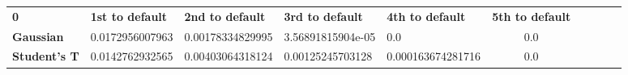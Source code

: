 \begin{tabular}{|l|l|l|l|l|c|c|c|c|c|}
\hline
\textbf{0} & \textbf{1st to default} & \textbf{2nd to default} & \textbf{3rd to default} & \textbf{4th to default} & \textbf{5th to default}\\\hhline{|=|=|=|=|=|=|}
\textbf{Gaussian} & 0.0172956007963 & 0.00178334829995 & 3.56891815904e-05 & 0.0 & 0.0\\
\textbf{Student's T} & 0.0142762932565 & 0.00403064318124 & 0.00125245703128 & 0.000163674281716 & 0.0\\
\hline
\end{tabular}
